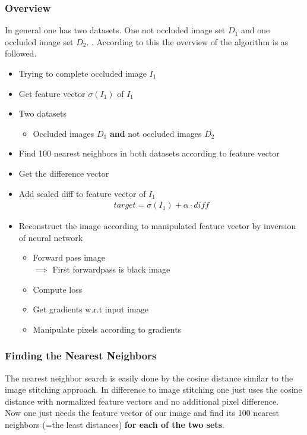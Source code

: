 \documentclass[
     11pt,         %
     a4paper,      %
     oneside,
     ]{article}
\begin{document}
\subsubsection{Overview}
In general one has two datasets. One not occluded image set $D_1$ and one occluded image set $D_2$.
. According to this the overview of the algorithm is as followed.
\begin{itemize}
	\item Trying to complete occluded image $I_1$
	\item Get feature vector $\sigma (I_1)$ of $I_1$
	\item Two datasets
    \begin{itemize}
        \item Occluded images $D_1$ \textbf{and} not occluded images $D_2$
    \end{itemize}
    \item Find 100 nearest neighbors in both datasets according to feature vector
    \item Get the difference vector
    \item Add scaled diff to feature vector of $I_1$
    \begin{align*}
    	target = \sigma (I_1) + \alpha \cdot diff
    \end{align*}
    \item Reconstruct the image according to manipulated feature vector by inversion of neural network
    \begin{itemize}
        \item Forward pass image \\
        $\implies$ First forwardpass is black image
        \item Compute loss
        \item Get gradients w.r.t input image
        \item Manipulate pixels according to gradients
    \end{itemize}
\end{itemize}


\subsubsection{Finding the Nearest Neighbors}
The nearest neighbor search is easily done by the cosine distance similar to the image stitching approach.
In difference to image stitching one just uses the cosine distance with normalized feature vectors and no additional pixel difference.\\
Now one just needs the feature vector of our image and find its 100 nearest neighbors (=the least distances) \textbf{for each of the two sets}.
\end{document}
